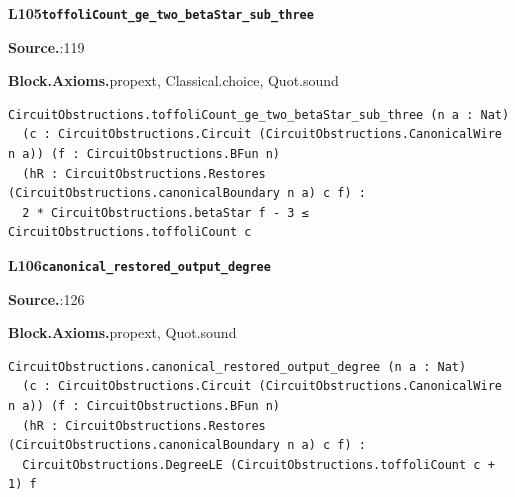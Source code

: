 \par\medskip\noindent\begin{minipage}{\textwidth}
{\small\bfseries L105\enspace\texttt{toffoliCount\_ge\_two\_betaStar\_sub\_three}\par}
{\footnotesize\raggedright\textbf{Source.}\enspace{}:119\par
\textbf{Block.}\quad\textbf{Axioms.}\enspace propext, Classical.choice, Quot.sound\par}\nopagebreak
\begin{lstlisting}
CircuitObstructions.toffoliCount_ge_two_betaStar_sub_three (n a : Nat)
  (c : CircuitObstructions.Circuit (CircuitObstructions.CanonicalWire n a)) (f : CircuitObstructions.BFun n)
  (hR : CircuitObstructions.Restores (CircuitObstructions.canonicalBoundary n a) c f) :
  2 * CircuitObstructions.betaStar f - 3 ≤ CircuitObstructions.toffoliCount c
\end{lstlisting}
\end{minipage}\par

\par\medskip\noindent\begin{minipage}{\textwidth}
{\small\bfseries L106\enspace\texttt{canonical\_restored\_output\_degree}\par}
{\footnotesize\raggedright\textbf{Source.}\enspace{}:126\par
\textbf{Block.}\quad\textbf{Axioms.}\enspace propext, Quot.sound\par}\nopagebreak
\begin{lstlisting}
CircuitObstructions.canonical_restored_output_degree (n a : Nat)
  (c : CircuitObstructions.Circuit (CircuitObstructions.CanonicalWire n a)) (f : CircuitObstructions.BFun n)
  (hR : CircuitObstructions.Restores (CircuitObstructions.canonicalBoundary n a) c f) :
  CircuitObstructions.DegreeLE (CircuitObstructions.toffoliCount c + 1) f
\end{lstlisting}
\end{minipage}\par

